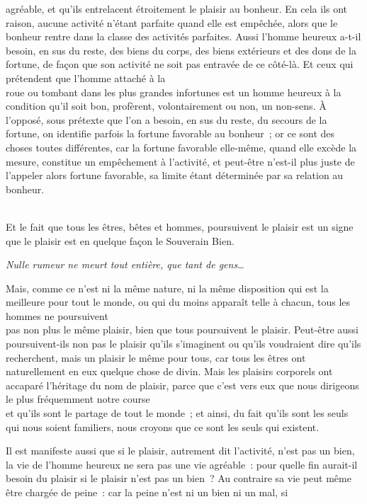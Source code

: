 \documentclass[french,twoside]{book} %
\begin{document}
agréable, et qu’ils entrelacent étroitement le plaisir au bonheur. En cela ils ont raison, aucune activité n’étant parfaite quand elle est empêchée, alors que le bonheur rentre dans la classe des activités parfaites. Aussi l’homme heureux a-t-il besoin, en sus du reste, des biens du corps, des biens extérieurs et des dons de la fortune, de façon que son activité ne soit pas entravée de ce côté-là. Et ceux qui prétendent que l’homme attaché à la \\
roue ou tombant dans les plus grandes infortunes est un homme heureux à la condition qu’il soit bon, profèrent, volontairement ou non, un non-sens. À l’opposé, sous prétexte que l’on a besoin, en sus du reste, du secours de la fortune, on identifie parfois la fortune favorable au bonheur ; or ce sont des choses toutes différentes, car la fortune favorable elle-même, quand elle excède la mesure, constitue un empêchement à l’activité, et peut-être n’est-il plus juste de l’appeler alors fortune favorable, sa limite étant déterminée par sa relation au bonheur.\par
\\
Et le fait que tous les êtres, bêtes et hommes, poursuivent le plaisir est un signe que le plaisir est en quelque façon le Souverain Bien.\par
 {\itshape Nulle rumeur ne meurt tout entière, que tant de gens…} \par
Mais, comme ce n’est ni la même nature, ni la même disposition qui est la meilleure pour tout le monde, ou qui du moins apparaît telle à chacun, tous les hommes ne poursuivent \\
pas non plus le même plaisir, bien que tous poursuivent le plaisir. Peut-être aussi poursuivent-ils non pas le plaisir qu’ils s’imaginent ou qu’ils voudraient dire qu’ils recherchent, mais un plaisir le même pour tous, car tous les êtres ont naturellement en eux quelque chose de divin. Mais les plaisirs corporels ont accaparé l’héritage du nom de plaisir, parce que c’est vers eux que nous dirigeons le plus fréquemment notre course \\
et qu’ils sont le partage de tout le monde ; et ainsi, du fait qu’ils sont les seuls qui nous soient familiers, nous croyons que ce sont les seuls qui existent.\par
 Il est manifeste aussi que si le plaisir, autrement dit l’activité, n’est pas un bien, la vie de l’homme heureux ne sera pas une vie agréable : pour quelle fin aurait-il besoin du plaisir si le plaisir n’est pas un bien ? Au contraire sa vie peut même être chargée de peine : car la peine n’est ni un bien ni un mal, si \\
\end{document}
